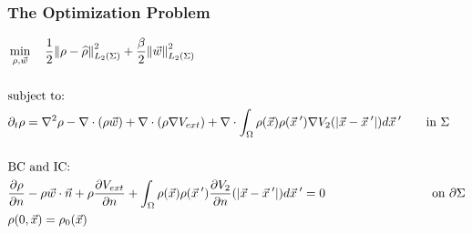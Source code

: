 \documentclass[aspectratio=169,xcolor=dvipsnames]{beamer}
\begin{document}
\begin{frame}
	\frametitle{The Optimization Problem}


		\begin{align*}
		&\min_{\rho,\vec{w}} \quad \frac{1}{2}\norm{\rho- \widehat{\rho}}_{L_2(\Sigma)}^2 + \frac{\beta}{2} \norm{\vec{w}}_{L_2(\Sigma)}^2\\
		\\
		&\text{subject to:}
		\\
		& \partial_t \rho = \nabla^2 \rho - \nabla \cdot (\rho \vec{w}) + \nabla \cdot \left(\rho \nabla V_{ext}\right)+\nabla \cdot \int_\Omega \rho(\vec{x}) \rho(\vec{x}\hspace{0.2em}') \nabla V_2(|\vec{x}-\vec{x}\hspace{0.2em}'|)d\vec{x}\hspace{0.2em}' \qquad { \text{in    } \Sigma}\\
		\\
		&{\text{BC } \text{and IC:}}\\
		&\frac{\partial \rho}{\partial n} - \rho \vec{w} \cdot \vec{n} + \rho \frac{\partial V_{ext}}{\partial n} +   \int_\Omega \rho(\vec{x}) \rho(\vec{x}\hspace{0.2em}')  \frac{ \partial  V_2}{\partial n}(|\vec{x}-\vec{x}\hspace{0.2em}'|)d\vec{x}\hspace{0.2em}'= 0 \quad \ \ \qquad \qquad \qquad \quad \text{on   } \partial \Sigma   \\
		&{\rho(0,\vec{x}) = \rho_0(\vec{x})} 
		\end{align*}
\end{frame}
\end{document}
